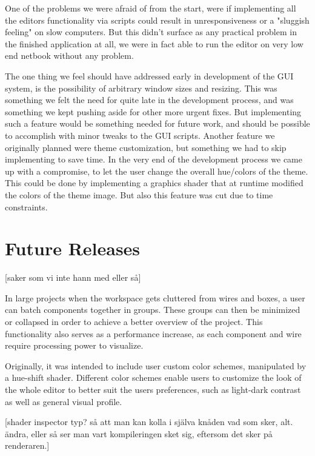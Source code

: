 One of the problems we were afraid of from the start, were if implementing all the editors functionality via scripts could result in unresponsiveness or a "sluggish feeling" on slow computers. But this didn't surface as any practical problem in the finished application at all, we were in fact able to run the editor on very low end netbook without any problem.

The one thing we feel should have addressed early in development of the GUI system, is the possibility of arbitrary window sizes and resizing. This was something we felt the need for quite late in the development process, and was something we kept pushing aside for other more urgent fixes. But implementing such a feature would be something needed for future work, and should be possible to accomplish with minor tweaks to the GUI scripts. Another feature we originally planned were theme customization, but something we had to skip implementing to save time. In the very end of the development process we came up with a compromise, to let the user change the overall hue/colors of the theme. This could be done by implementing a graphics shader that at runtime modified the colors of the theme image. But also this feature was cut due to time constraints. 



\section{Future Releases}
[saker som vi inte hann med eller så]

In large projects when the workspace gets cluttered from wires and boxes, a user can batch components together in groups. These groups can then be minimized or collapsed in order to achieve a better overview of the project. This functionality also serves as a performance increase, as each component and wire require processing power to visualize. 

Originally, it was intended to include user custom color schemes, manipulated by a hue-shift shader. Different color schemes enable users to customize the look of the whole editor to better suit the users preferences, such as light-dark contrast as well as general visual profile.

[shader inspector typ? så att man kan kolla i själva knåden vad som sker, alt. ändra, eller så ser man vart kompileringen sket sig, eftersom det sker på renderaren.]

